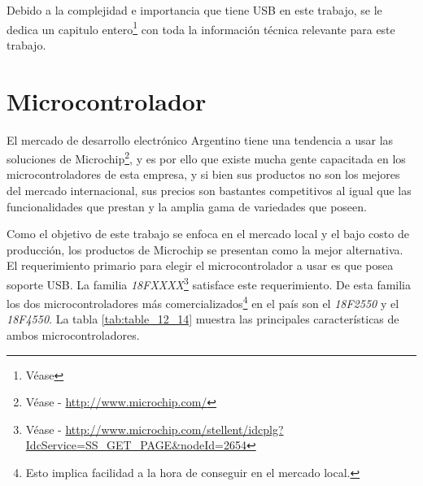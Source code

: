 Debido a la complejidad e importancia que tiene USB en este trabajo, se le
dedica un capitulo entero\footnote{V\'ease } con toda la
informaci\'on t\'ecnica relevante para este trabajo.


\section{Microcontrolador} %
El mercado de desarrollo electr\'onico Argentino tiene una tendencia a usar las
soluciones de Microchip\footnote{V\'ease - \url{http://www.microchip.com/}}, y
es por ello que existe mucha gente capacitada en los microcontroladores de esta
empresa, y si bien sus productos no son los mejores del mercado internacional,
sus precios son bastantes competitivos al igual que las funcionalidades que
prestan y la amplia gama de variedades que poseen.\

Como el objetivo de este trabajo se enfoca en el mercado local y el bajo costo
de producci\'on, los productos de Microchip se presentan como la mejor
alternativa.\\

El requerimiento primario para elegir el microcontrolador a usar es que posea
soporte USB. La familia \emph{18FXXXX}\footnote{V\'ease - \url{
http://www.microchip.com/stellent/idcplg?IdcService=SS_GET_PAGE&nodeId=2654}}
satisface este requerimiento. De esta familia los dos microcontroladores m\'as
comercializados\footnote{Esto implica facilidad a la hora de conseguir en el
mercado local.} en el pa\'is son el \emph{18F2550} y el \emph{18F4550}. La
tabla \ref{tab:table_12_14} muestra las principales caracter\'isticas de ambos
microcontroladores.

